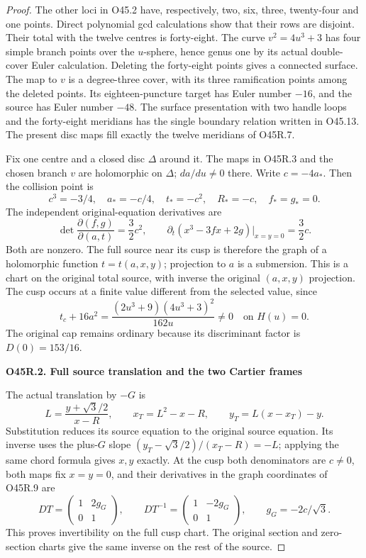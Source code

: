 \begin{proof}
The other loci in O45.2 have, respectively, two, six,
three, twenty-four and one points. Direct polynomial
gcd calculations show that their rows are disjoint.
Their total with the twelve centres is forty-eight.
The curve \(v^2=4u^3+3\) has four simple branch
points over the \(u\)-sphere, hence genus one by
its actual double-cover Euler calculation. Deleting
the forty-eight points gives a connected surface.
The map to \(v\) is a degree-three cover, with its
three ramification points among the deleted points.
Its eighteen-puncture target has Euler number
\(-16\), and the source has Euler number \(-48\).
The surface presentation with two handle loops and
the forty-eight meridians has the single boundary
relation written in O45.13. The present disc maps
fill exactly the twelve meridians of O45R.7.

Fix one centre and a closed disc \(\Delta\) around it.
The maps in O45R.3 and the chosen branch \(v\) are
holomorphic on \(\Delta\); \(da/du\ne0\) there.
Write \(c=-4a_*\). Then the collision point is
\[
 c^3=-3/4,\quad a_*=-c/4,\quad
 t_*=-c^2,\quad R_*=-c,\quad f_*=g_*=0 .
 \tag{O45R.8}
\]
The independent original-equation derivatives are
\[
 \det\frac{\partial(f,g)}{\partial(a,t)}
    =\frac32c^2,\qquad
 \partial_t(x^3-3fx+2g)|_{x=y=0}
    =\frac32c .
 \tag{O45R.9}
\]
Both are nonzero. The full source near its cusp is
therefore the graph of a holomorphic function
\(t=t(a,x,y)\); projection to \(a\) is a submersion.
This is a chart on the original total source, with
inverse the original \((a,x,y)\) projection.
The cusp occurs at a finite value different from
the selected value, since
\[
 t_c+16a^2=
 \frac{(2u^3+9)(4u^3+3)^2}{162u}\ne0
 \quad\text{on }H(u)=0.
 \tag{O45R.10}
\]
The original cap remains ordinary because its
discriminant factor is \(D(0)=153/16\).

\par

\medskip\noindent\textbf{O45R.2. Full source translation and the two Cartier frames}

\par\nobreak

The actual translation by \(-G\) is
\[
 L=\frac{y+\sqrt3/2}{x-R},\qquad
 x_T=L^2-x-R,\qquad y_T=L(x-x_T)-y .
 \tag{O45R.11}
\]
Substitution reduces its source equation to the
original source equation. Its inverse uses the
plus-\(G\) slope
\((y_T-\sqrt3/2)/(x_T-R)=-L\); applying the
same chord formula gives \(x,y\) exactly.
At the cusp both denominators are \(c\ne0\),
both maps fix \(x=y=0\), and their derivatives
in the graph coordinates of O45R.9 are
\[
 DT=\begin{pmatrix}1&2g_G\\0&1\end{pmatrix},
 \qquad
 DT^{-1}=\begin{pmatrix}1&-2g_G\\0&1\end{pmatrix},
 \qquad g_G=-2c/\sqrt3 .
 \tag{O45R.12}
\]
This proves invertibility on the full cusp chart.
The original section and zero-section charts give
the same inverse on the rest of the source.


\end{proof}
